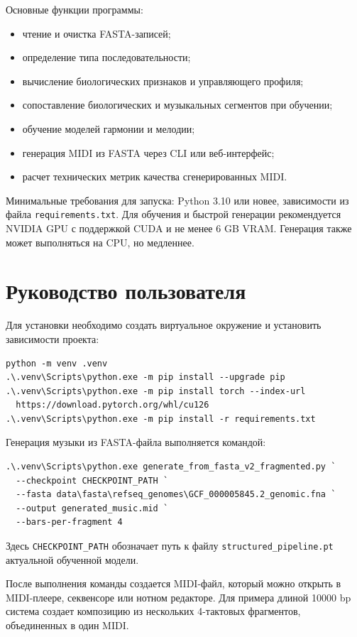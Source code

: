 Основные функции программы:
\begin{itemize}
\item чтение и очистка FASTA-записей;
\item определение типа последовательности;
\item вычисление биологических признаков и управляющего профиля;
\item сопоставление биологических и музыкальных сегментов при обучении;
\item обучение моделей гармонии и мелодии;
\item генерация MIDI из FASTA через CLI или веб-интерфейс;
\item расчет технических метрик качества сгенерированных MIDI.
\end{itemize}

Минимальные требования для запуска: Python 3.10 или новее, зависимости из файла \texttt{requirements.txt}. Для обучения и быстрой генерации рекомендуется NVIDIA GPU с поддержкой CUDA и не менее 6 GB VRAM. Генерация также может выполняться на CPU, но медленнее.

\section{Руководство пользователя}

Для установки необходимо создать виртуальное окружение и установить зависимости проекта:

\begin{verbatim}
python -m venv .venv
.\.venv\Scripts\python.exe -m pip install --upgrade pip
.\.venv\Scripts\python.exe -m pip install torch --index-url
  https://download.pytorch.org/whl/cu126
.\.venv\Scripts\python.exe -m pip install -r requirements.txt
\end{verbatim}

Генерация музыки из FASTA-файла выполняется командой:

\begin{verbatim}
.\.venv\Scripts\python.exe generate_from_fasta_v2_fragmented.py `
  --checkpoint CHECKPOINT_PATH `
  --fasta data\fasta\refseq_genomes\GCF_000005845.2_genomic.fna `
  --output generated_music.mid `
  --bars-per-fragment 4
\end{verbatim}

Здесь \texttt{CHECKPOINT\_PATH} обозначает путь к файлу \texttt{structured\_pipeline.pt} актуальной обученной модели.

После выполнения команды создается MIDI-файл, который можно открыть в MIDI-плеере, секвенсоре или нотном редакторе. Для примера длиной 10000 bp система создает композицию из нескольких 4-тактовых фрагментов, объединенных в один MIDI.

